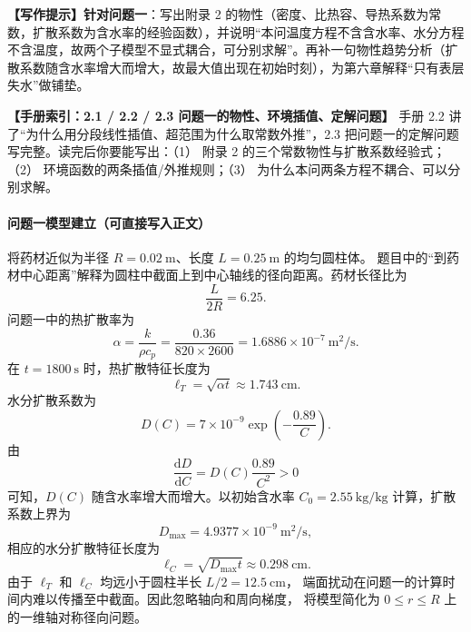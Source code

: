 \documentclass[12pt,a4paper]{article}
\newcommand{\prompt}[1]{\par\noindent\textbf{【写作提示】}#1\par}      %
\newcommand{\handbook}[2]{\par\noindent\textbf{【手册索引：#1】} #2\par}
\begin{document}
\prompt{\textbf{针对问题一}：写出附录 2 的物性（密度、比热容、导热系数为常数，扩散系数为含水率的经验函数），并说明“本问温度方程不含含水率、水分方程不含温度，故两个子模型不显式耦合，可分别求解”。再补一句物性趋势分析（扩散系数随含水率增大而增大，故最大值出现在初始时刻），为第六章解释“只有表层失水”做铺垫。}

\handbook{2.1 / 2.2 / 2.3 问题一的物性、环境插值、定解问题}{手册 2.2 讲了“为什么用分段线性插值、超范围为什么取常数外推”，2.3 把问题一的定解问题写完整。读完后你要能写出：（1） 附录 2 的三个常数物性与扩散系数经验式；（2） 环境函数的两条插值/外推规则；（3） 为什么本问两条方程不耦合、可以分别求解。}

\paragraph{问题一模型建立（可直接写入正文）}
将药材近似为半径 $R=0.02\ \mathrm{m}$、长度 $L=0.25\ \mathrm{m}$ 的均匀圆柱体。
题目中的“到药材中心距离”解释为圆柱中截面上到中心轴线的径向距离。药材长径比为
\begin{equation}
\frac{L}{2R}=6.25.
\end{equation}
问题一中的热扩散率为
\begin{equation}
\alpha=\frac{k}{\rho c_p}
 =\frac{0.36}{820\times2600}
 =1.6886\times10^{-7}\ \mathrm{m^2/s}.
\end{equation}
在 $t=1800\ \mathrm{s}$ 时，热扩散特征长度为
\begin{equation}
\ell_T=\sqrt{\alpha t}\approx1.743\ \mathrm{cm}.
\end{equation}
水分扩散系数为
\begin{equation}
D(C)=7\times10^{-9}\exp\left(-\frac{0.89}{C}\right).
\end{equation}
由
\begin{equation}
\frac{\mathrm dD}{\mathrm dC}=D(C)\frac{0.89}{C^2}>0
\end{equation}
可知，$D(C)$ 随含水率增大而增大。以初始含水率
$C_0=2.55\ \mathrm{kg/kg}$ 计算，扩散系数上界为
\begin{equation}
D_{\max}=4.9377\times10^{-9}\ \mathrm{m^2/s},
\end{equation}
相应的水分扩散特征长度为
\begin{equation}
\ell_C=\sqrt{D_{\max}t}\approx0.298\ \mathrm{cm}.
\end{equation}
由于 $\ell_T$ 和 $\ell_C$ 均远小于圆柱半长 $L/2=12.5\ \mathrm{cm}$，
端面扰动在问题一的计算时间内难以传播至中截面。因此忽略轴向和周向梯度，
将模型简化为 $0\le r\le R$ 上的一维轴对称径向问题。
\end{document}
